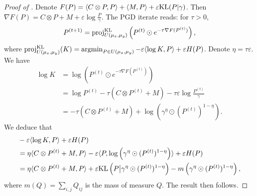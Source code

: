\begin{proof}[Proof of ]
  Denote $F(P) = \langle C \otimes P, P \rangle + \langle M, P \rangle + \varepsilon \text{KL}(P | \gamma)$.
  Then $\nabla F(P) = C \otimes P + M + \varepsilon \log \frac{P}{\gamma}$.
  The PGD iterate reads: for $\tau > 0$,
  \begin{align}
    P^{(t+1)} = \text{proj}^{\text{KL}}_{U(\mu_x, \mu_y)}
    \left( P^{(t)} \odot e^{-\tau \nabla F(P^{(t)})} \right),
  \end{align}
  where $\text{proj}^{\text{KL}}_{U(\mu_x, \mu_y)}(K) =
  \operatorname*{argmin}_{P \in U(\mu_x, \mu_y)} - \varepsilon \langle \log K, P \rangle + \varepsilon H(P)$.
  Denote $\eta = \tau \varepsilon$. We have
  \begin{align}
    \log K &= \log \left( P^{(t)} \odot e^{-\tau \nabla F(P^{(t)})} \right) \\
    &= \log P^{(t)} - \tau (C \otimes P^{(t)} + M)  - \tau \varepsilon \log \frac{P^{(t)}}{\gamma} \\
    &= - \tau (C \otimes P^{(t)} + M) + \log \left( \gamma^{\eta} \odot (P^{(t)})^{1 - \eta} \right).
  \end{align}
  We deduce that
  \begin{align}
    &- \varepsilon \langle \log K, P \rangle + \varepsilon H(P) \\
    &= \eta \langle C \otimes P^{(t)} + M, P \rangle
    - \varepsilon \langle P, \log \left( \gamma^{\eta} \odot (P^{(t)})^{1 - \eta} \right) \rangle
    + \varepsilon H(P) \\
    &= \eta \langle C \otimes P^{(t)} + M, P \rangle +
    \varepsilon \text{KL} \left( P \big | \gamma^{\eta} \odot (P^{(t)})^{1 - \eta} \right)
    - m \left( \gamma^{\eta} \odot (P^{(t)})^{1 - \eta} \right),
  \end{align}
  where $m(Q) = \sum_{i,j} Q_{ij}$ is the mass of measure $Q$. The result then follows.
\end{proof}
